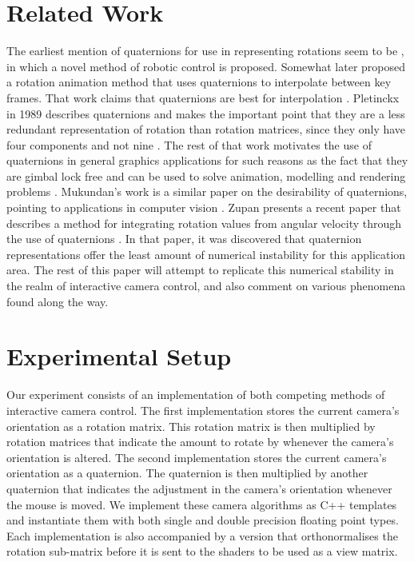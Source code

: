 \documentclass{acm_proc_article-sp}
\begin{document}
\section{Related Work}

The earliest mention of quaternions for use in representing rotations seem to be \cite{taylor79}, in which a novel method of robotic control is proposed.
Somewhat later \cite{schoemake85} proposed a rotation animation method that uses quaternions to interpolate between key frames.
That work claims that quaternions are best for interpolation \cite{schoemake85}.
Pletinckx in 1989 describes quaternions and makes the important point that they are a less redundant representation of rotation than rotation matrices, since they only have four components and not nine \cite{pletinckx89}.
The rest of that work motivates the use of quaternions in general graphics applications for such reasons as the fact that they are gimbal lock free \cite{pletinckx89} and can be used to solve animation, modelling and rendering problems \cite{pletinckx89}.
Mukundan's work is a similar paper on the desirability of quaternions, pointing to applications in computer vision \cite{mukundan02}.
Zupan presents a recent paper that describes a method for integrating rotation values from angular velocity through the use of quaternions \cite{zupan11}.
In that paper, it was discovered that quaternion representations offer the least amount of numerical instability for this application area.
The rest of this paper will attempt to replicate this numerical stability in the realm of interactive camera control, and also comment on various phenomena found along the way.

\section{Experimental Setup}

Our experiment consists of an implementation of both competing methods of interactive camera control.
The first implementation stores the current camera's orientation as a rotation matrix.
This rotation matrix is then multiplied by rotation matrices that indicate the amount to rotate by whenever the camera's orientation is altered.
The second implementation stores the current camera's orientation as a quaternion.
The quaternion is then multiplied by another quaternion that indicates the adjustment in the camera's orientation whenever the mouse is moved.
We implement these camera algorithms as C++ templates and instantiate them with both single and double precision floating point types.
Each implementation is also accompanied by a version that orthonormalises the rotation sub-matrix before it is sent to the shaders to be used as a view matrix.
\end{document}
